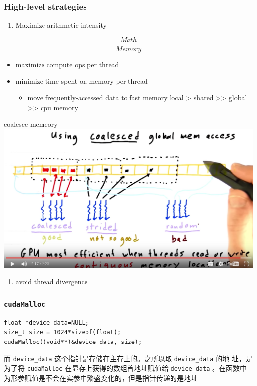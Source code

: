 \documentclass[11pt]{article}
\begin{document}
\subsubsection{High-level strategies}
\label{sec:orgheadline13}
\begin{enumerate}
\item Maximize arithmetic intensity
\end{enumerate}
\[\frac{Math}{Memory}\]
\begin{itemize}
\item maximize compute ops per thread
\item minimize time spent on memory per thread
\begin{itemize}
\item move frequently-accessed data to fast memory
local > shared >> global >> cpu memory
\end{itemize}
\end{itemize}
coalesce memeory
\includegraphics[width=.9\linewidth]{./images/coalesce.png}
\begin{enumerate}
\item avoid thread divergence
\end{enumerate}

\subsubsection{\texttt{cudaMalloc}}
\label{sec:orgheadline14}
\begin{verbatim}
float *device_data=NULL;  
size_t size = 1024*sizeof(float);  
cudaMalloc((void**)&device_data, size);
\end{verbatim}
而 \texttt{device\_data} 这个指针是存储在主存上的。之所以取 \texttt{device\_data} 的地
址，是为了将 \texttt{cudaMalloc} 在显存上获得的数组首地址赋值给 \texttt{device\_data}
。在函数中为形参赋值是不会在实参中繁盛变化的，但是指针传递的是地址 
\end{document}
